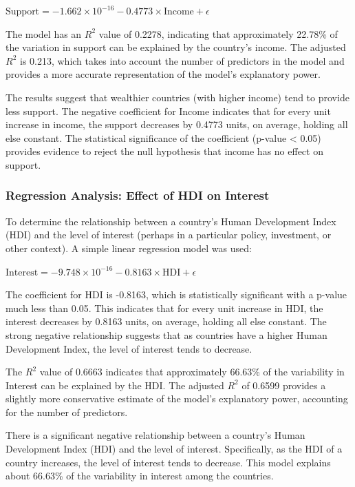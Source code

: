 \documentclass[12pt]{article}
\begin{document}
$\text{Support} = -1.662 \times 10^{-16} - 0.4773 \times \text{Income} + \epsilon$

The model has an $R^2$ value of 0.2278, indicating that approximately 22.78\% of the variation in support can be explained by the country's income. The adjusted  $R^2$ is 0.213, which takes into account the number of predictors in the model and provides a more accurate representation of the model's explanatory power.

The results suggest that wealthier countries (with higher income) tend to provide less support. The negative coefficient for Income indicates that for every unit increase in income, the support decreases by 0.4773 units, on average, holding all else constant. The statistical significance of the coefficient (p-value < 0.05) provides evidence to reject the null hypothesis that income has no effect on support.


\subsubsection{Regression Analysis: Effect of HDI on Interest}
\label{sss.hdivsint}

To determine the relationship between a country's Human Development Index (HDI) and the level of interest (perhaps in a particular policy, investment, or other context). A simple linear regression model was used:

$\text{Interest} = -9.748 \times 10^{-16} - 0.8163 \times \text{HDI} + \epsilon$

The coefficient for HDI is -0.8163, which is statistically significant with a p-value much less than 0.05. This indicates that for every unit increase in HDI, the interest decreases by 0.8163 units, on average, holding all else constant. The strong negative relationship suggests that as countries have a higher Human Development Index, the level of interest tends to decrease.

The $R^2$  value of 0.6663 indicates that approximately 66.63\% of the variability in Interest can be explained by the HDI. The adjusted 
$R^2$  of 0.6599 provides a slightly more conservative estimate of the model's explanatory power, accounting for the number of predictors.

There is a significant negative relationship between a country's Human Development Index (HDI) and the level of interest. Specifically, as the HDI of a country increases, the level of interest tends to decrease. This model explains about 66.63\% of the variability in interest among the countries.
\end{document}
